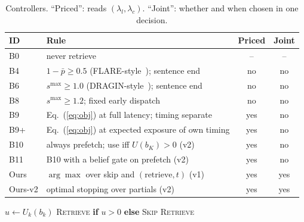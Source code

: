 \begin{table}[t]
\caption{Controllers. ``Priced'': reads $(\lambda_l,\lambda_c)$. ``Joint'':
whether and when chosen in one decision.}
\label{tab:controllers}
\centering
\footnotesize
\setlength{\tabcolsep}{3pt}
\begin{tabular}{@{}l p{4.1cm} c c@{}}
\toprule
ID & Rule & Priced & Joint\\
\midrule
B0 & never retrieve & -- & --\\
B4 & $1-\bar p\ge0.5$ (FLARE-style~\cite{jiang2023flare}); sentence end & no & no\\
B6 & $s^{\max}\ge1.0$ (DRAGIN-style~\cite{su2024dragin}); sentence end & no & no\\
B8 & $s^{\max}\ge1.2$; fixed early dispatch & no & no\\
B9 & Eq.~(\ref{eq:obj}) at full latency; timing separate & yes & no\\
B9+ & Eq.~(\ref{eq:obj}) at expected exposure of own timing & yes & no\\
B10 & always prefetch; use iff $U(b_K)>0$ (v2) & yes & no\\
B11 & B10 with a belief gate on prefetch (v2) & yes & no\\
Ours & $\arg\max$ over skip and $(\text{retrieve},t)$ (v1) & yes & yes\\
Ours-v2 & optimal stopping over partials (v2) & yes & yes\\
\bottomrule
\end{tabular}
\end{table}

\begin{algorithm}[t]
\caption{Ours-v2 for one turn (\textsc{commit})}
\label{alg:oursv2}
\begin{algorithmic}[1]
  \State $u\gets U_k(b_k)$ 
   \Return \textsc{Retrieve} \textbf{if} $u>0$ \textbf{else} \textsc{Skip}
  \EndIf
   \Return \textsc{Retrieve}
  \EndIf
\EndFor
\end{algorithmic}
\end{algorithm}
